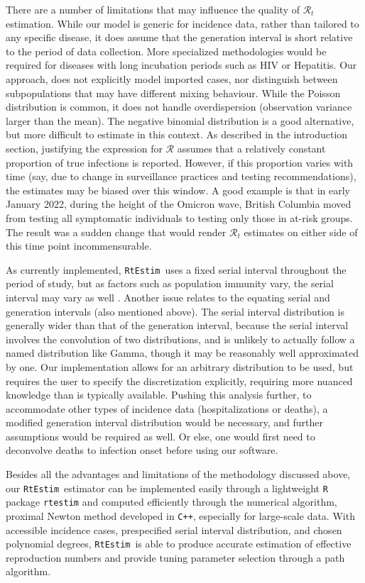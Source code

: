 \documentclass[10pt,letterpaper]{article}
\def\RtEstim{\texttt{RtEstim}}
\def\calR{\mathcal{R}}
\newcommand{\citep}[1]{\cite{#1}}
\begin{document}
There are a number of limitations that may influence the quality of
$\calR_t$ estimation. While our model is generic for incidence data, 
rather than tailored to any specific disease, it does assume that the 
generation interval is short relative to the period of data collection. 
More specialized methodologies would be required for diseases with long 
incubation periods such as HIV or Hepatitis. 
Our approach, does not explicitly model imported cases, nor distinguish between
subpopulations that may have different mixing behaviour. 
While the Poisson distribution is common, it does not handle overdispersion
(observation variance larger than the mean). The negative binomial distribution
is a good alternative, but more difficult to estimate in this context.
As described in the introduction section, justifying the expression for $\calR$ 
assumes that a relatively constant proportion of true infections is reported. 
However, if this proportion varies with time (say, due to change in surveillance
practices and testing recommendations), the estimates may be biased over this
window. A good example is that in early January 2022, during the height of the
Omicron wave, British Columbia moved from testing all symptomatic individuals to
testing only those in at-risk groups. The result was a sudden change that would
render $\calR_t$ estimates on either side of this time point incommensurable.


As currently implemented, \RtEstim\ uses a fixed serial interval throughout the
period of study, but as factors such as population immunity vary, the serial
interval may vary as well \citep{nash2023estimating}.  
Another issue relates to the equating serial and generation intervals (also
mentioned above). The serial interval distribution is generally
wider than that of the generation interval, because the serial interval
involves the convolution of two distributions, and is unlikely to actually
follow a named distribution like Gamma, though it may be reasonably well
approximated by one. Our implementation allows for an arbitrary distribution to
be used, but requires the user to specify the discretization explicitly,
requiring more nuanced knowledge than is typically available.
Pushing this analysis further, to accommodate other types of incidence data
(hospitalizations or deaths), a modified generation interval distribution would be
necessary, and further assumptions would be required as well. Or else, one would
first need to deconvolve deaths to infection onset before using our software.


Besides all the advantages and limitations of the methodology discussed above, 
our \RtEstim\ estimator can be implemented easily through a lightweight \texttt{R} 
package \texttt{rtestim} and computed efficiently through the numerical algorithm, 
proximal Newton method developed in \texttt{C++}, especially for large-scale data. 
With accessible incidence cases, prespecified serial interval distribution, and
chosen polynomial degrees, \RtEstim\ is able to produce accurate estimation 
of effective reproduction numbers and provide tuning parameter selection 
through a path algorithm. 
\end{document}
